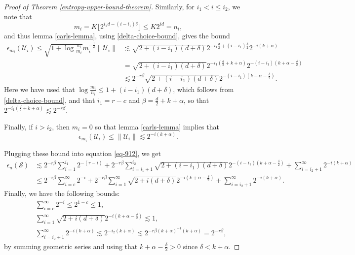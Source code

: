 \begin{proof}[Proof of Theorem \ref{entropy-upper-bound-theorem}]
Similarly, for $i_1 < i\leq i_2$, we note that
$$m_i = K\lfloor2^{i_1d - (i - i_1)\delta}\rfloor \leq K2^{id} = n_i,$$
and thus lemma \ref{carls-lemma}, using \eqref{delta-choice-bound}, gives the bound
\begin{equation}
\begin{split}
 \epsilon_{m_i}(\mathcal{U}_i) \leq \sqrt{1+\log{\frac{n_i}{m_i}}}m_i^{-\frac{1}{2}}\|\mathcal{U}_i\| &\lesssim \sqrt{2 + (i-i_1)(d + \delta)}2^{-i_1\frac{d}{2}+(i-i_1)\frac{\delta}{2}}2^{-i(k+\alpha)} \\
 & = \sqrt{2 + (i-i_1)(d + \delta)}2^{-i_1\left(\frac{d}{2}+k+\alpha\right)}2^{-(i-i_1)\left(k+\alpha - \frac{\delta}{2}\right)} \\
 & \lesssim 2^{-r\beta}\sqrt{2 + (i-i_1)(d + \delta)}2^{-(i-i_1)\left(k+\alpha - \frac{\delta}{2}\right)}.
 \end{split}
\end{equation}
Here we have used that $\log{\frac{m_i}{n_i}} \leq 1 + (i-i_1)(d + \delta)$, which follows from \eqref{delta-choice-bound}, and that $i_1 = r-c$ and $\beta = \frac{d}{2}+k+\alpha$, so that $2^{-i_1\left(\frac{d}{2}+k+\alpha\right)} \lesssim 2^{-r\beta}$.

Finally, if $i > i_2$, then $m_i = 0$ so that lemma \ref{carls-lemma} implies that
\begin{equation}
 \epsilon_{m_i}(\mathcal{U}_i) \leq \|\mathcal{U}_i\| \lesssim 2^{-i(k+\alpha)}.
\end{equation}

Plugging these bound into equation \eqref{eq-912}, we get
\begin{equation}\label{eq-998}
\begin{split}
 \epsilon_n(\mathcal{S})
 & \lesssim 2^{-r\beta}\sum_{i=1}^{i_1}2^{-(r-i)} + 2^{-r\beta}\sum_{i=i_1+1}^{i_2}\sqrt{2 + (i-i_1)(d + \delta)}2^{-(i-i_1)\left(k+\alpha - \frac{\delta}{2}\right)} + \sum_{i=i_2+1}^\infty2^{-i(k+\alpha)} \\
 & \leq 2^{-r\beta}\sum_{i=c}^{\infty}2^{-i} + 2^{-r\beta}\sum_{i=1}^{\infty}\sqrt{2 + i(d + \delta)}2^{-i\left(k+\alpha - \frac{\delta}{2}\right)} + \sum_{i=i_2+1}^\infty2^{-i(k+\alpha)}.
 \end{split}
\end{equation}
Finally, we have the following bounds:
\begin{equation}
\begin{split}
 &\sum_{i=c}^{\infty}2^{-i} \leq 2^{1-c} \leq 1,\\
 &\sum_{i=1}^{\infty}\sqrt{2 + i(d + \delta)}2^{-i\left(k+\alpha - \frac{\delta}{2}\right)} \lesssim 1, \\
 &\sum_{i=i_2+1}^\infty2^{-i(k+\alpha)} \lesssim 2^{-i_2(k+\alpha)} \lesssim 2^{-r\beta(k+\alpha)^{-1}(k+\alpha)} = 2^{-r\beta},
 \end{split}
\end{equation}
by summing geometric series and using that $k+\alpha - \frac{\delta}{2} > 0$ since $\delta < k+\alpha$.


\end{proof}
